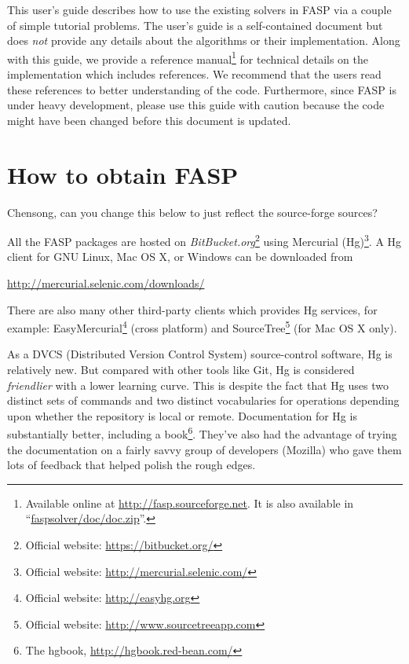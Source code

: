 \documentclass[11pt]{memoir}
\begin{document}
This user's guide describes how to use the existing solvers in FASP
via a couple of simple tutorial problems. The user's guide is a
self-contained document but does \emph{not} provide any details about
the algorithms or their implementation. Along with this guide, we provide a
reference manual\footnote{Available online at
  \url{http://fasp.sourceforge.net}. It is also available in
  ``\url{faspsolver/doc/doc.zip}''.} for technical details on the
implementation which includes references. We recommend that the users
read these references to better
understanding of the code. Furthermore, since FASP is under heavy
development, please use this guide with caution because the code might
have been changed before this document is updated.


\section{How to obtain FASP}\label{sec:install}

{\color{red} Chensong, can you change this below to just reflect the
  source-forge sources?}

All the FASP packages are hosted on
\emph{BitBucket.org}\footnote{Official website:
  \url{https://bitbucket.org/}} using Mercurial (Hg)\footnote{Official
  website: \url{http://mercurial.selenic.com/}}. A Hg client for GNU
Linux, Mac OS X, or Windows can be downloaded from
\begin{center}
  \url{http://mercurial.selenic.com/downloads/}
\end{center}
%
There are also many other third-party clients which provides Hg services, for example: EasyMercurial\footnote{Official website: \url{http://easyhg.org}} (cross platform) and SourceTree\footnote{Official website: \url{http://www.sourcetreeapp.com}} (for Mac OS X only).

As a DVCS (Distributed Version Control System) source-control
software, Hg is relatively new. But compared with other tools like
Git, Hg is considered \emph{friendlier} with a lower learning
curve. This is despite the fact that Hg uses two distinct sets of
commands and two distinct vocabularies for operations depending upon
whether the repository is local or remote.  Documentation for Hg is
substantially better, including a book\footnote{The hgbook,
  \url{http://hgbook.red-bean.com/}}. They've also had the advantage
of trying the documentation on a fairly savvy group of developers
(Mozilla) who gave them lots of feedback that helped polish the rough
edges.
\end{document}
